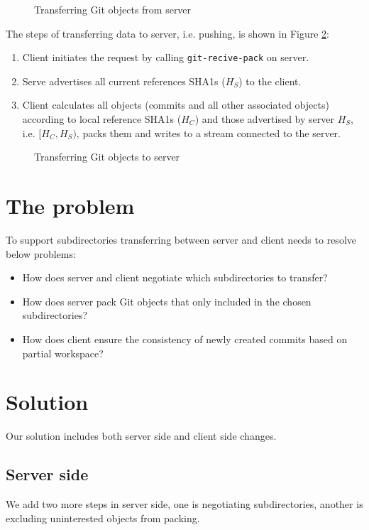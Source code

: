 \documentclass[preprint]{sigplanconf}
\begin{document}
\begin{figure}
  \centering
  
  \caption{Transferring Git objects from server}
  \label{fig:git-proto-clone-seq}
\end{figure}
The steps of transferring data to server, i.e. pushing, is shown in Figure \ref{fig:git-proto-push-seq}:
\begin{enumerate}
  \item Client initiates the request by calling \verb|git-recive-pack| on server.
  \item Serve advertises all current references SHA1s ($H_S$) to the client.
  \item Client calculates all objects (commits and all other associated objects) according to local reference SHA1s ($H_C$) and those advertised by server $H_S$, i.e. $[H_C, H_S)$, packs them and writes to a stream connected to the server.
\end{enumerate}


\begin{figure}
  \centering
  
  \caption{Transferring Git objects to server}
  \label{fig:git-proto-push-seq}
\end{figure}

\section{The problem}
To support subdirectories transferring between server and client needs to resolve below problems:
\begin{itemize}
  \item How does server and client negotiate which subdirectories to transfer?
  \item How does server pack Git objects that only included in the chosen subdirectories?
  \item How does client ensure the consistency of newly created commits based on partial workspace?
\end{itemize}

\section{Solution}
Our solution includes both server side and client side changes.
\subsection{Server side}
We add two more steps in server side, one is negotiating subdirectories, another is excluding uninterested objects from packing.
\end{document}
